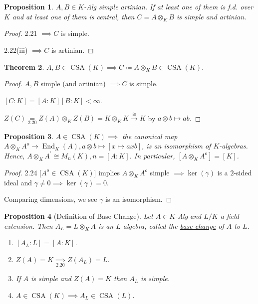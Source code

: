 \documentclass{article}
\theoremstyle{definition}
\theoremstyle{plain}
\newtheorem{theorem}{Theorem}[section]
\newtheorem{proposition}[theorem]{Proposition}
\theoremstyle{remark}
\begin{document}
    \begin{proposition}
        \(A, B \in K\)-Alg simple artinian. If at least one of them is f.d. over \(K\) and at least one of them is central, then \(C = A \otimes_K B\) is simple and artinian. 
    \end{proposition}

    \begin{proof}
        2.21 \(\implies C\) is simple.

        2.22(iii) \(\implies C\) is artinian.
    \end{proof}

    \begin{theorem}
        \(A, B \in \operatorname{CSA}(K) \implies C\coloneqq A \otimes_K B \in \operatorname{CSA}(K)\).
    \end{theorem}

    \begin{proof}
        \(A, B\) simple (and artinian) \(\implies C\) is simple.

        \([C:K] = [A:K][B:K] < \infty\).

        \(Z(C) \underset{2.20}{=} Z(A) \otimes_K Z(B) = K \otimes_K K \xrightarrow{\cong} K\) by \(a \otimes b \mapsto ab\).
    \end{proof}

    \begin{proposition}
        \(A \in \operatorname{CSA}(K) \implies\) the canonical map \(A \otimes_K A^o \to \operatorname{End}_K (A), a \otimes b \mapsto [x \mapsto axb]\), is an isomorphism of \(K\)-algebras. Hence, \(A \otimes_K A^{\prime} \cong M_n(K), n = [A:K]\). In particular, \([A \otimes_K A^o] = [K]\).
    \end{proposition}

    \begin{proof}
        2.24 [\(A^o \in \operatorname{CSA}(K)\)]  implies \(A \otimes_K A^o\) simple \(\implies \ker (\gamma)\) is a \(2\)-sided ideal and \(\gamma \neq 0 \implies \ker (\gamma) = 0\).

        Comparing dimensions, we see \(\gamma\) is an isomorphism.
    \end{proof}

    \begin{proposition}[Definition of Base Change]
        Let \(A\in K\)-Alg and \(L / K\) a field extension. Then \(A_L = L \otimes_K A\) is an \(L\)-algebra, called the \underline{base change} of \(A\) to \(L\).


        \begin{enumerate}[label=\roman*)]
            \item \([A_L : L] = [A:K]\).
            \item \(Z(A) = K \underset{2.20}{\implies} Z(A_L) = L\).
            \item If \(A\) is simple and \(Z(A) = K\) then \(A_L\) is simple.
            \item \(A\in \operatorname{CSA}(K) \implies A_L \in \operatorname{CSA}(L)\). 
        \end{enumerate} 
    \end{proposition}
\end{document}
